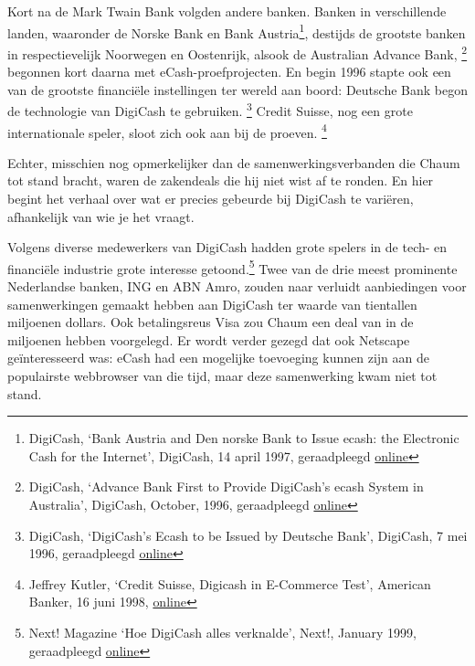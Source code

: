 \documentclass[smalldemyvopaper,11pt,twoside,onecolumn,openright,extrafontsizes,hidelinks]{memoir}
\begin{document}
Kort na de Mark Twain Bank volgden andere banken. Banken in
verschillende landen, waaronder de Norske Bank en Bank
Austria\footnote{DigiCash, `Bank Austria and Den norske Bank to Issue
  ecash: the Electronic Cash for the Internet', DigiCash, 14 april 1997,
  geraadpleegd
  \href{https://web.archive.org/web/19970605025912/http://www.digicash.com:80/publish/ec_pres8.html}{online}},
destijds de grootste banken in respectievelijk Noorwegen en Oostenrijk,
alsook de Australian Advance Bank, \footnote{DigiCash, `Advance Bank
  First to Provide DigiCash's ecash System in Australia', DigiCash,
  October, 1996, geraadpleegd
  \href{https://web.archive.org/web/19961102121407/https://www.digicash.com/publish/ec_pres6.html}{online}}
begonnen kort daarna met eCash-proefprojecten. En begin 1996 stapte ook
een van de grootste financiële instellingen ter wereld aan boord:
Deutsche Bank begon de technologie van DigiCash te gebruiken.
\footnote{DigiCash, `DigiCash's Ecash to be Issued by Deutsche Bank',
  DigiCash, 7 mei 1996, geraadpleegd
  \href{https://web.archive.org/web/19961102121355/https://www.digicash.com/publish/ec_pres5.html}{online}}
Credit Suisse, nog een grote internationale speler, sloot zich ook aan
bij de proeven. \footnote{Jeffrey Kutler, `Credit Suisse, Digicash in
  E-Commerce Test', American Banker, 16 juni 1998,
  \href{https://www.americanbanker.com/news/credit-suisse-digicash-in-e-commerce-test}{online}}

Echter, misschien nog opmerkelijker dan de samenwerkingsverbanden die
Chaum tot stand bracht, waren de zakendeals die hij niet wist af te
ronden. En hier begint het verhaal over wat er precies gebeurde bij
DigiCash te variëren, afhankelijk van wie je het vraagt.

Volgens diverse medewerkers van DigiCash hadden grote spelers in de
tech- en financiële industrie grote interesse getoond.\footnote{Next!
  Magazine `Hoe DigiCash alles verknalde', Next!, January 1999,
  geraadpleegd
  \href{https://web.archive.org/web/19990427142412/https://www.nextmagazine.nl/ecash.htm}{online}}
Twee van de drie meest prominente Nederlandse banken, ING en ABN Amro,
zouden naar verluidt aanbiedingen voor samenwerkingen gemaakt hebben aan
DigiCash ter waarde van tientallen miljoenen dollars. Ook betalingsreus
Visa zou Chaum een deal van in de miljoenen hebben voorgelegd. Er wordt
verder gezegd dat ook Netscape geïnteresseerd was: eCash had een
mogelijke toevoeging kunnen zijn aan de populairste webbrowser van die
tijd, maar deze samenwerking kwam niet tot stand.
\end{document}
